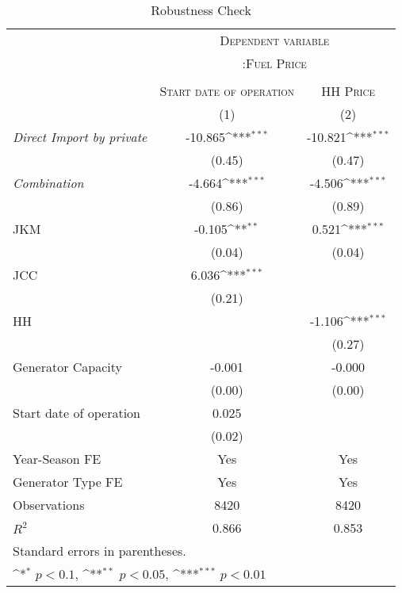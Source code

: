 \documentclass[12pt]{article}
\begin{document}
\begin{table}[htbp]\centering
\def\sym#1{\ifmmode^{#1}\else\(^{#1}\)\fi}
\caption{Robustness Check\label{tab1}}
\renewcommand{\arraystretch}{0.7}
\begin{tabular}{l*{2}{c}}
\toprule
 & \multicolumn{2}{c}{\textsc{Dependent variable}} \\ 
                     &\multicolumn{2}{c}{\textsc{:Fuel Price}}\\
                                          \cline{2-3}  \\
                  &\multicolumn{1}{c}{\textsc{Start date of operation}}&\multicolumn{1}{c}{\textsc{HH Price}}\\    
                    &\multicolumn{1}{c}{(1)}&\multicolumn{1}{c}{(2)}\\

\hline \hline
\addlinespace
\textit{Direct Import by private}             &     -10.865\sym{***}&     -10.821\sym{***}\\
                    &      (0.45)         &      (0.47)         \\
\addlinespace
\textit{Combination}  &      -4.664\sym{***}&      -4.506\sym{***}\\
                    &      (0.86)         &      (0.89)         \\
\addlinespace
JKM                 &      -0.105\sym{**} &       0.521\sym{***}\\
                    &      (0.04)         &      (0.04)         \\
\addlinespace
JCC                 &       6.036\sym{***}&                     \\
                    &      (0.21)         &                     \\
\addlinespace
HH                  &                     &      -1.106\sym{***}\\
                    &                     &      (0.27)         \\                    
\addlinespace
Generator Capacity         &      -0.001         &      -0.000         \\
                    &      (0.00)         &      (0.00)         \\
\addlinespace
Start date of operation        &       0.025         &                     \\
                    &      (0.02)         &                     \\

\midrule
Year-Season FE          &    Yes &    Yes\\
Generator Type FE         &    Yes &    Yes\\
Observations                   &    8420         &    8420         \\
$R^2$                   &       0.866         &       0.853         \\
\bottomrule
\multicolumn{3}{l}{\footnotesize Standard errors in parentheses.}\\
\multicolumn{3}{l}{\footnotesize \sym{*} \(p<0.1\), \sym{**} \(p<0.05\), \sym{***} \(p<0.01\)}\\
\end{tabular}
\end{table}
\end{document}

